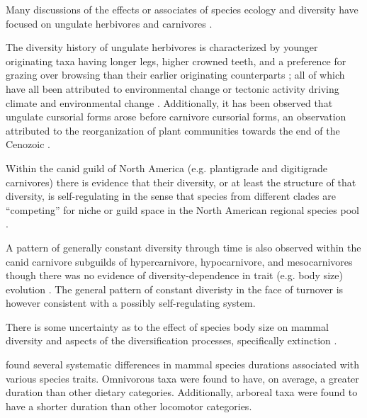 \documentclass[12pt,letterpaper]{article}
\begin{document}
Many discussions of the effects or associates of species ecology and diversity have focused on ungulate herbivores \citep{Janis2004,Janis2000,Janis1993c,Janis2008a} and carnivores \citep{Pires2015a,Slater2015c,Janis1993c,Silvestro2015b}.

The diversity history of ungulate herbivores is characterized by younger originating taxa having longer legs, higher crowned teeth, and a preference for grazing over browsing than their earlier originating counterparts \citep{Janis2004,Janis2000,Janis1993c,Janis2008a}; all of which have all been attributed to environmental change or tectonic activity driving climate and environmental change \citep{Janis2008a,Eronen2015,Blois2009}. Additionally, it has been observed that ungulate cursorial forms arose before carnivore cursorial forms, an observation attributed to the reorganization of plant communities towards the end of the Cenozoic \citep{Janis1993c}.

Within the canid guild of North America (e.g. plantigrade and digitigrade carnivores) there is evidence that their diversity, or at least the structure of that diversity, is self-regulating in the sense that species from different clades are ``competing'' for niche or guild space in the North American regional species pool \citep{Silvestro2015b}.

A pattern of generally constant diversity through time is also observed within the canid carnivore subguilds of hypercarnivore, hypocarnivore, and mesocarnivores though there was no evidence of diversity-dependence in trait (e.g. body size) evolution \citep{Slater2015c}. The general pattern of constant diveristy in the face of turnover is however consistent with a possibly self-regulating system.

There is some uncertainty as to the effect of species body size on mammal diversity and aspects of the diversification processes, specifically extinction \citep{Liow2008,Liow2009,Tomiya2013,Smits2015b}.

\citet{Smits2015b} found several systematic differences in mammal species durations associated with various species traits. Omnivorous taxa were found to have, on average, a greater duration than other dietary categories. Additionally, arboreal taxa were found to have a shorter duration than other locomotor categories. 
\end{document}
